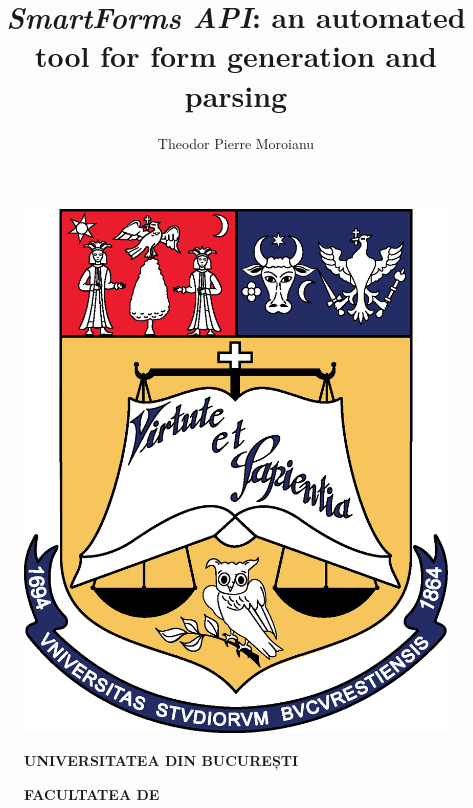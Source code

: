\documentclass[11pt, a4paper]{report}
\title{\emph{SmartForms API}: an automated tool for form generation and parsing}
\author{Theodor Pierre Moroianu}
\begin{document}
\cleardoublepage
\pagestyle{front}
\let\ps@plain\ps@front

\begin{titlepage}

  
  \begin{figure}[!htb]
      \centering
      \begin{minipage}{0.2\textwidth}
          \includegraphics[width=\linewidth]{logo-ub.png}
      \end{minipage}
      \begin{minipage}{0.5\textwidth}
          \large
          \vspace{0.2cm}
          \begin{center}
              \textbf{UNIVERSITATEA DIN BUCUREȘTI}
          \end{center}
          \vspace{0.3cm}
          \begin{center}
              \textbf{
                  FACULTATEA DE \\
}
\end{center}
\end{minipage}
\end{figure}
\end{titlepage}
\end{document}
